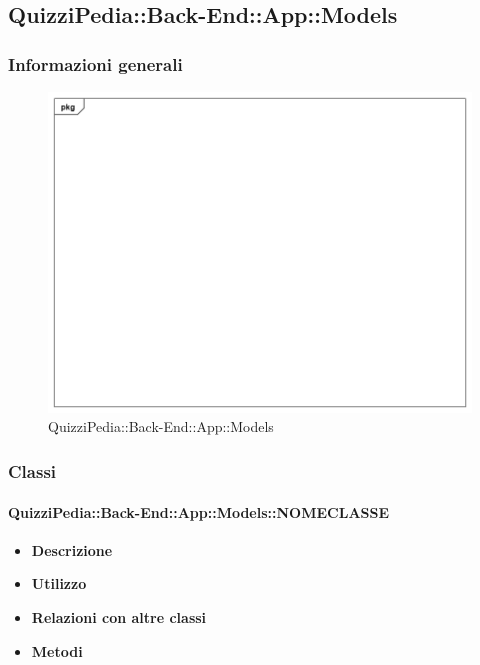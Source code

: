 \subsection{QuizziPedia::Back-End::App::Models}
\subsubsection{Informazioni generali}
\label{QuizziPedia::Back-End::App::Models}
\begin{figure}
	\centering
	\includegraphics[scale=0.45]{UML/Package/QuizziPedia_Back-End_App_Models.png}
	\caption{QuizziPedia::Back-End::App::Models}
\end{figure}

\subsubsection{Classi}
\paragraph{QuizziPedia::Back-End::App::Models::NOMECLASSE}
\begin{itemize}
	\item \textbf{Descrizione} \\
	\item \textbf{Utilizzo} \\
	\item \textbf{Relazioni con altre classi} \\
	\item \textbf{Metodi} \\
\end{itemize}
